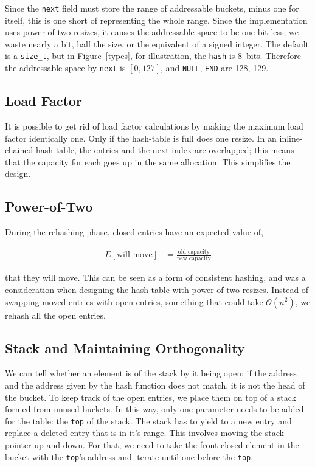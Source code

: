 \documentclass[12pt]{article}
\newcommand{\code}[1]{\colorbox{light-gray}{\texttt{#1}}}
\begin{document}
Since the \code{next} field must store the range of addressable buckets, minus one for itself, this is one short of representing the whole range. Since the implementation uses power-of-two resizes, it causes the addressable space to be one-bit less; we waste nearly a bit, half the size, or the equivalent of a signed integer. %
The default is a \code{size\_t}, but in Figure~\ref{types}, for illustration, the \code{hash} is 8~bits. Therefore the addressable space by \code{next} is $[0, 127]$, and \code{NULL}, \code{END} are 128, 129.

\subsection{Load Factor}

It is possible to get rid of load factor calculations by making the maximum load factor identically one. Only if the hash-table is full does one resize. In an inline-chained hash-table, the entries and the next index are overlapped; this means that the capacity for each goes up in the same allocation. This simplifies the design.

\subsection{Power-of-Two}

During the rehashing phase, closed entries have an expected value of,

\begin{align*}
E[\text{will move}] &= \frac{\text{old capacity}}{\text{new capacity}}
\end{align*}

that they will move. This can be seen as a form of consistent hashing\cite{karger1997consistent}, and was a consideration when designing the hash-table with power-of-two resizes. Instead of swapping moved entries with open entries, something that could take $\mathcal{O}(n^2)$, we rehash all the open entries.

\subsection{Stack and Maintaining Orthogonality}

We can tell whether an element is of the stack by it being open; if the address and the address given by the hash function does not match, it is not the head of the bucket. To keep track of the open entries, we place them on top of a stack formed from unused buckets. In this way, only one parameter needs to be added for the table: the \code{top} of the stack. The stack has to yield to a new entry and replace a deleted entry that is in it's range. This involves moving the stack pointer up and down. For that, we need to take the front closed element in the bucket with the \code{top}'s address and iterate until one before the \code{top}.
\end{document}
